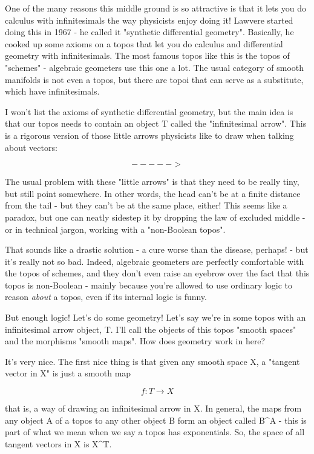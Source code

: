 One of the many reasons this middle ground is so attractive is that it
lets you do calculus with infinitesimals the way physicists enjoy
doing it!  Lawvere started doing this in 1967 - he called it
"synthetic differential geometry".  Basically, he cooked up
some axioms on a topos that let you do calculus and differential
geometry with infinitesimals.  The most famous topos like this is the
topos of "schemes" - algebraic geometers use this one a lot.
The usual category of smooth manifolds is not even a topos, but there
are topoi that can serve as a substitute, which have infinitesimals.

I won't list the axioms of synthetic differential geometry, but the
main idea is that our topos needs to contain an object T called the 
"infinitesimal arrow".  This is a rigorous version of those little 
arrows physicists like to draw when talking about vectors:  

$$
                             ----->
$$
    
The usual problem with these "little arrows" is that they need to be
really tiny, but still point somewhere.  In other words, the head
can't be at a finite distance from the tail - but they can't be at the 
same place, either!  This seems like a paradox, but one can neatly 
sidestep it by dropping the law of excluded middle - or in technical
jargon, working with a "non-Boolean topos". 

That sounds like a drastic solution - a cure worse than the disease, 
perhaps! - but it's really not so bad.  Indeed, algebraic geometers 
are perfectly comfortable with the topos of schemes, and they don't 
even raise an eyebrow over the fact that this topos is non-Boolean - 
mainly because you're allowed to use ordinary logic to reason \emph{about}
a topos, even if its internal logic is funny.

But enough logic!  Let's do some geometry!  Let's say we're in some
topos with an infinitesimal arrow object, T.  I'll call the objects of
this topos "smooth spaces" and the morphisms "smooth
maps".  How does geometry work in here?

It's very nice.  The first nice thing is that given any smooth space X, 
a "tangent vector in X" is just a smooth map 

$$
f: T \to  X
$$
    
that is, a way of drawing an infinitesimal arrow in X.  In general, the
maps from any object A of a topos to any other object B form an object
called B^{A} - this is part of what we mean when we say a topos has 
exponentials.  So, the space of all tangent vectors in X is X^{T}.  

